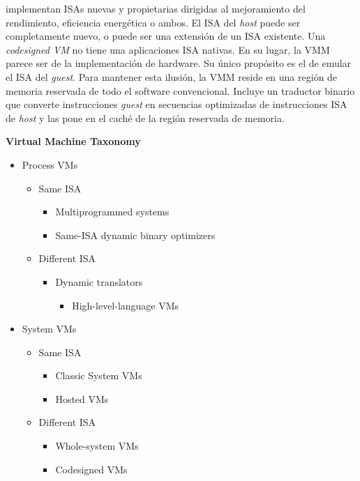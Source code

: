implementan ISAs nuevas y propietarias dirigidas al mejoramiento del rendimiento, eficiencia energética o ambos. El ISA del \textit{host} puede ser completamente nuevo, o puede ser una extensión de un ISA existente. Una \emph{codesigned VM} no tiene una aplicaciones ISA nativas. En su lugar, la VMM parece ser de la implementación de hardware. Su único propósito es el de emular el ISA del \emph{guest}. Para mantener esta ilusión, la VMM reside en una región de memoria reservada de todo el software convencional. Incluye un traductor binario que converte instrucciones \emph{guest} en secuencias optimizadas de instrucciones ISA de \emph{host} y las pone en el caché de la región reservada de memoria.

\textbf{Virtual Machine Taxonomy}

\begin{minipage}{0.5\textwidth}
\begin{itemize}
    \item Process VMs
    \begin{itemize}
        \item Same ISA
        \begin{itemize}
            \item Multiprogrammed systems
            \item[] Same-ISA dynamic binary optimizers
        \end{itemize}
        \item Different ISA
        \begin{itemize}
            \item Dynamic translators
            \begin{itemize}
                \item[] High-level-language VMs
            \end{itemize}
        \end{itemize}
    \end{itemize}
\end{itemize}
\end{minipage}
\begin{minipage}{0.4\textwidth}
\begin{itemize}
    \item System VMs
    \begin{itemize}
        \item Same ISA
        \begin{itemize}
            \item Classic System VMs
            \item[] Hosted VMs
        \end{itemize}
        \item Different ISA
        \begin{itemize}
            \item Whole-system VMs
            \item[] Codesigned VMs
        \end{itemize}
    \end{itemize}
\end{itemize}
\end{minipage}


